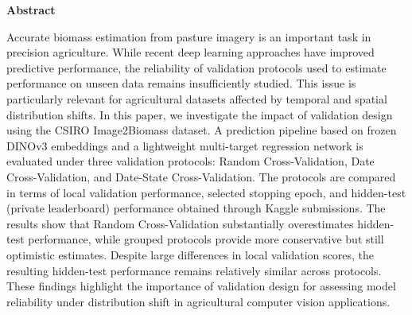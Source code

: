 \newpage
\begin{center}
    \LARGE
    \textbf{\thesistitle}
    
    \vspace{0.5cm}
    
    \authornamefl
    
    \vspace{1cm}
    
    \textbf{Abstract}
    
    \vspace{1cm}
\end{center}





Accurate biomass estimation from pasture imagery is an important task in precision agriculture. While recent deep learning approaches have improved predictive performance, the reliability of validation protocols used to estimate performance on unseen data remains insufficiently studied. This issue is particularly relevant for agricultural datasets affected by temporal and spatial distribution shifts.
In this paper, we investigate the impact of validation design using the CSIRO Image2Biomass dataset. A prediction pipeline based on frozen DINOv3 embeddings and a lightweight multi-target regression network is evaluated under three validation protocols: Random Cross-Validation, Date Cross-Validation, and Date-State Cross-Validation. The protocols are compared in terms of local validation performance, selected stopping epoch, and hidden-test (private leaderboard) performance obtained through Kaggle submissions.
The results show that Random Cross-Validation substantially overestimates hidden-test performance, while grouped protocols provide more conservative but still optimistic estimates. Despite large differences in local validation scores, the resulting hidden-test performance remains relatively similar across protocols. These findings highlight the importance of validation design for assessing model reliability under distribution shift in agricultural computer vision applications.